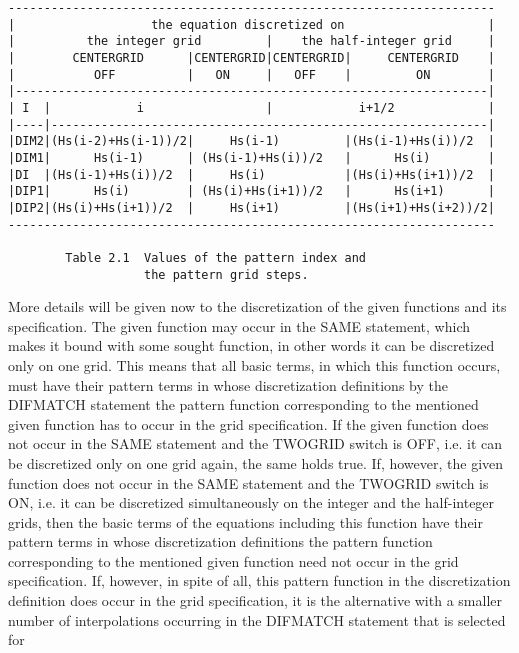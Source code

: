 {\footnotesize\begin{verbatim}
--------------------------------------------------------------------
|                   the equation discretized on                    |
|          the integer grid         |    the half-integer grid     |
|        CENTERGRID      |CENTERGRID|CENTERGRID|     CENTERGRID    |
|           OFF          |   ON     |   OFF    |         ON        |
|------------------------------------------------------------------|
| I  |            i                 |            i+1/2             |
|----|-------------------------------------------------------------|
|DIM2|(Hs(i-2)+Hs(i-1))/2|     Hs(i-1)         |(Hs(i-1)+Hs(i))/2  |
|DIM1|      Hs(i-1)      | (Hs(i-1)+Hs(i))/2   |      Hs(i)        |
|DI  |(Hs(i-1)+Hs(i))/2  |     Hs(i)           |(Hs(i)+Hs(i+1))/2  |
|DIP1|      Hs(i)        | (Hs(i)+Hs(i+1))/2   |      Hs(i+1)      |
|DIP2|(Hs(i)+Hs(i+1))/2  |     Hs(i+1)         |(Hs(i+1)+Hs(i+2))/2|
--------------------------------------------------------------------

        Table 2.1  Values of the pattern index and
                   the pattern grid steps.
\end{verbatim}}
     More details  will be  given now to the discretization of the given
functions and  its specification.  The given  function may  occur in the
SAME statement, which makes it bound with some sought function, in other
words it can be discretized only on one grid. This means that  all basic
terms, in  which this  function occurs, must have their pattern terms in
whose discretization definitions by  the DIFMATCH  statement the pattern
function corresponding  to the  mentioned given function has to occur in
the grid specification. If the given function does not occur in the SAME
statement and the TWOGRID switch is OFF, i.e. it can be discretized only
on one grid again, the same holds true. If, however,  the given function
does not  occur in the SAME statement and the TWOGRID switch is ON, i.e.
it can be discretized simultaneously on the integer and the half-integer
grids, then  the basic  terms of  the equations  including this function
have their pattern terms in whose discretization definitions the pattern
function corresponding to the mentioned given function need not occur in
the grid specification.  If, however,  in  spite  of  all,  this pattern
function  in  the  discretization  definition  does  occur  in  the grid
specification,  it  is  the  alternative  with   a  smaller   number  of
interpolations occurring  in the DIFMATCH statement that is selected for
